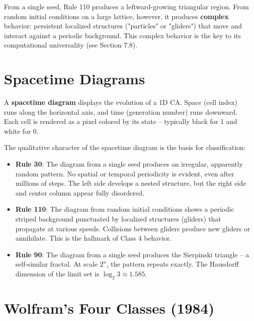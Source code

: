 From a single seed, Rule 110 produces a leftward-growing triangular region. From random initial conditions on a large lattice, however, it produces \textbf{complex} behavior: persistent localized structures ("particles" or "gliders") that move and interact against a periodic background. This complex behavior is the key to its computational universality (see Section 7.8).


\section{Spacetime Diagrams}

A \textbf{spacetime diagram} displays the evolution of a 1D CA. Space (cell index) runs along the horizontal axis, and time (generation number) runs downward. Each cell is rendered as a pixel colored by its state -- typically black for 1 and white for 0.

The qualitative character of the spacetime diagram is the basis for classification:

\begin{itemize}
\item \textbf{Rule 30}: The diagram from a single seed produces an irregular, apparently random pattern. No spatial or temporal periodicity is evident, even after millions of steps. The left side develops a nested structure, but the right side and center column appear fully disordered.
\end{itemize}

\begin{itemize}
\item \textbf{Rule 110}: The diagram from random initial conditions shows a periodic striped background punctuated by localized structures (gliders) that propagate at various speeds. Collisions between gliders produce new gliders or annihilate. This is the hallmark of Class 4 behavior.
\end{itemize}

\begin{itemize}
\item \textbf{Rule 90}: The diagram from a single seed produces the Sierpinski triangle -- a self-similar fractal. At scale $2^n$, the pattern repeats exactly. The Hausdorff dimension of the limit set is $\log_2 3 \approx 1.585$.
\end{itemize}


\section{Wolfram's Four Classes (1984)}

